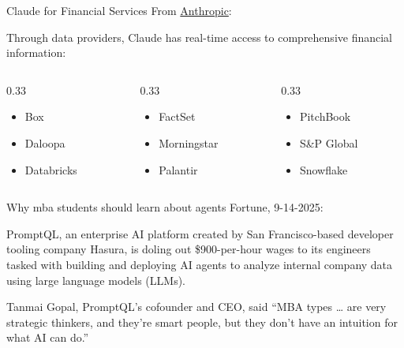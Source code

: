 \documentclass[
  ignorenonframetext,
]{beamer}
\providecommand{\tightlist}{%
  \setlength{\itemsep}{0pt}\setlength{\parskip}{0pt}}\usepackage{longtable,booktabs,array}
\begin{document}
\begin{frame}{Claude for Financial Services}
\label{claude-for-financial-services}
From
\href{https://www.anthropic.com/news/claude-for-financial-services}{Anthropic}:

Through data providers, Claude has real-time access to comprehensive
financial information:

\begin{columns}[T]
\begin{column}{0.33\linewidth}
\begin{itemize}
\tightlist
\item
  Box
\item
  Daloopa
\item
  Databricks
\end{itemize}
\end{column}

\begin{column}{0.33\linewidth}
\begin{itemize}
\tightlist
\item
  FactSet
\item
  Morningstar
\item
  Palantir
\end{itemize}
\end{column}

\begin{column}{0.33\linewidth}
\begin{itemize}
\tightlist
\item
  PitchBook
\item
  S\&P Global
\item
  Snowflake
\end{itemize}
\end{column}
\end{columns}
\end{frame}

\begin{frame}{Why mba students should learn about agents}
\label{why-mba-students-should-learn-about-agents}
Fortune, 9-14-2025:

PromptQL, an enterprise AI platform created by San Francisco-based
developer tooling company Hasura, is doling out {\$900-per-hour} wages
to its engineers tasked with building and deploying AI agents to analyze
internal company data using large language models (LLMs).

Tanmai Gopal, PromptQL's cofounder and CEO, said ``{MBA types} \ldots{}
are very strategic thinkers, and they're smart people, but they {don't
have an intuition for what AI can do}.''
\end{frame}
\end{document}
